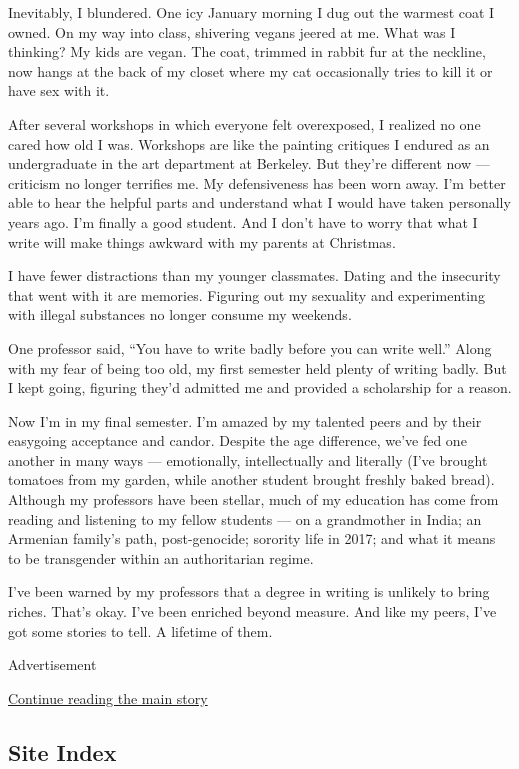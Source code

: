 Inevitably, I blundered. One icy January morning I dug out the warmest
coat I owned. On my way into class, shivering vegans jeered at me. What
was I thinking? My kids are vegan. The coat, trimmed in rabbit fur at
the neckline, now hangs at the back of my closet where my cat
occasionally tries to kill it or have sex with it.

After several workshops in which everyone felt overexposed, I realized
no one cared how old I was. Workshops are like the painting critiques I
endured as an undergraduate in the art department at Berkeley. But
they're different now --- criticism no longer terrifies me. My
defensiveness has been worn away. I'm better able to hear the helpful
parts and understand what I would have taken personally years ago. I'm
finally a good student. And I don't have to worry that what I write will
make things awkward with my parents at Christmas.

I have fewer distractions than my younger classmates. Dating and the
insecurity that went with it are memories. Figuring out my sexuality and
experimenting with illegal substances no longer consume my weekends.

One professor said, ``You have to write badly before you can write
well.'' Along with my fear of being too old, my first semester held
plenty of writing badly. But I kept going, figuring they'd admitted me
and provided a scholarship for a reason.

Now I'm in my final semester. I'm amazed by my talented peers and by
their easygoing acceptance and candor. Despite the age difference, we've
fed one another in many ways --- emotionally, intellectually and
literally (I've brought tomatoes from my garden, while another student
brought freshly baked bread). Although my professors have been stellar,
much of my education has come from reading and listening to my fellow
students --- on a grandmother in India; an Armenian family's path,
post-genocide; sorority life in 2017; and what it means to be
transgender within an authoritarian regime.

I've been warned by my professors that a degree in writing is unlikely
to bring riches. That's okay. I've been enriched beyond measure. And
like my peers, I've got some stories to tell. A lifetime of them.

Advertisement

\protect\hyperlink{after-bottom}{Continue reading the main story}

\hypertarget{site-index}{%
\subsection{Site Index}\label{site-index}}

